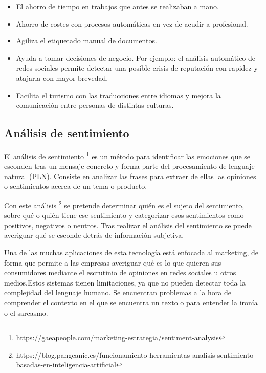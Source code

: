 \begin{itemize}
	\item El ahorro de tiempo en trabajos que antes se realizaban a mano.
	\item Ahorro de costes con procesos automáticas en vez de acudir a profesional.
	\item Agiliza el etiquetado manual de documentos.
	\item Ayuda a tomar decisiones de negocio. Por ejemplo: el análisis automático de redes sociales permite detectar una posible crisis de reputación con rapidez y atajarla con mayor brevedad.
	\item Facilita el turismo con las traducciones entre idiomas y mejora la comunicación entre personas de distintas culturas.
\end{itemize}

\subsection{Análisis de sentimiento} \label{sentiment}

El análisis de sentimiento \footnote{https://gaeapeople.com/marketing-estrategia/sentiment-analysis} es un método para identificar las emociones que se esconden tras un mensaje concreto y forma parte del procesamiento de lenguaje natural (PLN). Consiste en analizar las frases para extraer de ellas las opiniones o sentimientos acerca de un tema o producto.

Con este análisis \footnote{https://blog.pangeanic.es/funcionamiento-herramientas-analisis-sentimiento-basadas-en-inteligencia-artificial} se pretende determinar quién es el sujeto del sentimiento, sobre qué o quién tiene ese sentimiento y categorizar esos sentimientos como positivos, negativos o neutros. Tras realizar el análisis del sentimiento se puede averiguar qué se esconde detrás de información subjetiva.

Una de las muchas aplicaciones de esta tecnología está enfocada al marketing, de forma que permite a las empresas averiguar qué es lo que quieren sus consumidores mediante el escrutinio de opiniones en redes sociales u otros medios.Estos sistemas tienen limitaciones, ya que no pueden detectar toda la complejidad del lenguaje humano. Se encuentran problemas a la hora de comprender el contexto en el que se encuentra un texto o para entender la ironía o el sarcasmo.

